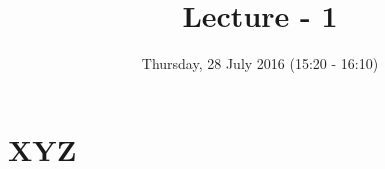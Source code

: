 \documentclass{llncs}
\title{Lecture - 1}			%
\author{Thursday, 28 July 2016 (15:20 - 16:10)}			%
\institute{Puzzles : Monty Hall Show, Coin Tossing Game}	%
\begin{document}
\maketitle
\section{XYZ}


%
\end{document}
